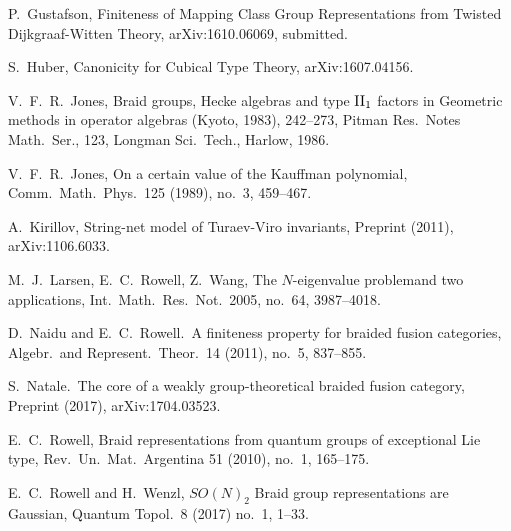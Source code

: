 \documentclass[12pt]{article}
\theoremstyle{plain} \numberwithin{equation}{section}
\theoremstyle{definition}
\begin{document}
\begin{thebibliography}{0}
          
 P.\ Gustafson, {Finiteness of Mapping Class Group Representations from Twisted Dijkgraaf-Witten Theory}, arXiv:1610.06069, submitted.

  S.\ Huber, Canonicity for Cubical Type Theory, arXiv:1607.04156.

   
 V.\ F.\ R.\ Jones, {Braid groups, Hecke algebras and type ${\rm II}\sb 1$ factors} in Geometric methods in operator algebras (Kyoto, 1983), 242--273, Pitman Res.\ Notes Math.\ Ser., 123, Longman Sci.\ Tech., Harlow, 1986.

 V.\ F.\ R.\ Jones, {On a certain value of the Kauffman polynomial}, Comm.\ Math.\ Phys.\ {125} (1989), no.\ 3, 459--467.

   A.\ Kirillov, {String-net model of {Turaev-Viro} invariants}, Preprint (2011), arXiv:1106.6033.
  
 M.\ J.\ Larsen, E.\ C.\ Rowell, Z.\ Wang, {The $N$-eigenvalue problemand two applications}, Int.\ Math.\ Res.\ Not.\  2005,  no.\ 64, 3987--4018. 
    
 D.\ Naidu and E.\ C.\ Rowell.\ A finiteness property for braided fusion categories, Algebr.\ and Represent.\ Theor.\ {14} (2011), no.\ 5, 837--855.

 S.\ Natale.\ The core of a weakly group-theoretical braided fusion category, Preprint (2017), arXiv:1704.03523.

  E.\ C.\ Rowell, Braid representations from quantum groups of exceptional Lie type, Rev.\ Un.\ Mat.\ Argentina {51} (2010), no.\ 1, 165--175.

    E.\ C.\ Rowell and H.\ Wenzl, $SO(N)_2$ Braid group representations are Gaussian, Quantum Topol.\ {8} (2017) no.\ 1, 1--33.
    
\end{thebibliography}
\end{document}
